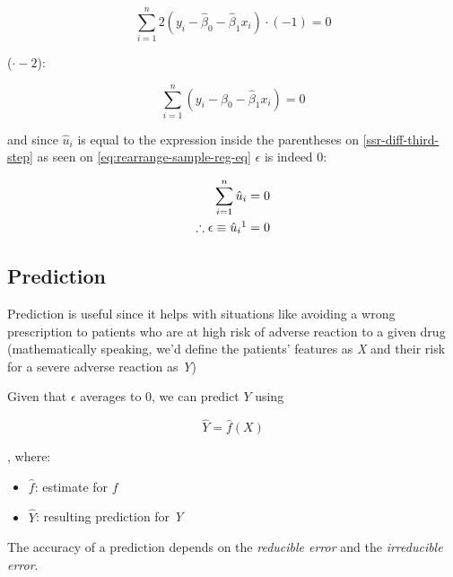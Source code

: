 \documentclass{article}
\theoremstyle{mytheoremstyle}
\theoremstyle{mytheoremstyle}
\theoremstyle{myproblemstyle}
\begin{document}
\begin{equation}
	\sum_{i=1}^{n} 2(y_i - \hat{\beta}_0 - \hat{\beta}_1 x_i) \cdot (-1) = 0
\end{equation}

($\cdot -2$):

\begin{equation}
	\sum_{i=1}^{n}(y_i - \hat{\beta}_0 - \hat{\beta}_1 x_i) = 0
	\label{ssr-diff-third-step}
\end{equation}

and since $\hat{u}_i$ is equal to the expression
inside the parentheses on \eqref{ssr-diff-third-step}
as seen on \eqref{eq:rearrange-sample-reg-eq}
$\epsilon$ is indeed 0:

\begin{equation}
	\begin{split}
		\sum_{i=1}^{n}\hat{u}_i                             & = 0 \\
		\therefore \epsilon \equiv  \hat{u}_i \footnotemark & = 0
	\end{split}
\end{equation}

\subsection{Prediction} %

Prediction is useful since it helps with
situations like avoiding a wrong prescription
to patients who are at high risk of
adverse reaction to a given
drug (mathematically speaking,
we'd define the patients' features as \textit{X}
and their
risk for a severe adverse reaction as \textit{Y})

Given that $ \epsilon $ averages to $ 0 $,
we can predict $ Y $ using

\begin{equation}
	\hat{Y} = \hat{f}(\textit{X})
	\label{eq:initial-y-pred}
\end{equation}

, where:

\begin{itemize}
	\item $ \hat{f} $: estimate for $ f $
	\item $ \hat{Y} $: resulting prediction for \textit{Y}
\end{itemize}

The accuracy of a prediction depends on
the \textit{reducible error} and the
\textit{irreducible error}.
\end{document}

